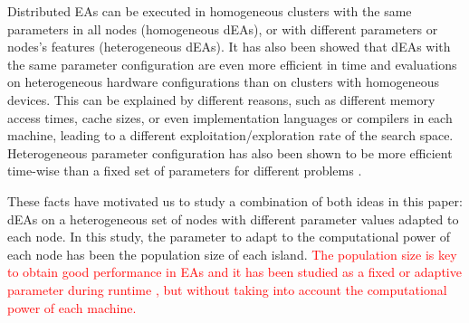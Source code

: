 \documentclass[final,1p,times]{elsarticle}
\begin{document}
Distributed EAs can be executed in homogeneous clusters with the same parameters in all nodes (homogeneous dEAs), or with different parameters or nodes's features (heterogeneous dEAs).
It  has also been showed \cite{HETEROGENEOUSHARD} that dEAs with the same parameter configuration are even
more efficient in time and evaluations on heterogeneous hardware configurations than on clusters with
homogeneous devices. This can be explained by different reasons, such
as different memory access times, cache sizes, %
or even implementation
languages or compilers in each machine, leading to a different
exploitation/exploration rate of the search space. %
Heterogeneous parameter
configuration  has also been shown to be more  efficient time-wise than a fixed
set %
of parameters for different problems
\cite{HETEROGENEOUSPARAMETERS}.   %

These facts have motivated us to study a combination of both ideas in this paper: dEAs on a heterogeneous set of nodes with different parameter values adapted to each node. In this study, the parameter to adapt to the computational power of each node has been the population size of each island. \textcolor{red}{The population size is key to obtain good performance in EAs \cite{ShrinkageLaredo09} and it has been studied as a fixed \cite{SizingHarik99} or adaptive parameter during runtime \cite{AdaptiveLobo07}, but without taking into account the computational power of each machine.}
\end{document}
